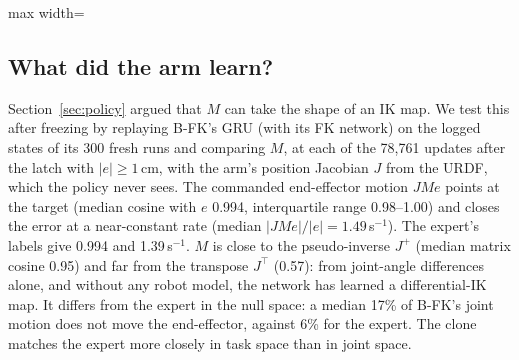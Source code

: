 \documentclass[conference]{IEEEtran}
\begin{document}
\begin{table}[t]
\centering\footnotesize
\caption{Ablations (validation set, 208 scenes, unless noted). Below the first two rows: URDF variant}
\label{tab:ablation}
\begin{adjustbox}{max width=\columnwidth}\end{adjustbox}
\end{table}

\subsection{What did the arm learn?}\label{sec:arm}
Section~\ref{sec:policy} argued that $M$ can take the shape of an IK map. We test this after freezing
by replaying B-FK's GRU (with its FK network) on the logged states of its 300 fresh runs and comparing
$M$, at each of the 78,761 updates after the latch with $|e|\ge1$\,cm, with the arm's position Jacobian
$J$ from the URDF, which the policy never sees. The commanded end-effector motion $JMe$ points at the
target (median cosine with $e$ 0.994, interquartile range 0.98--1.00) and closes the error at a
near-constant rate (median $|JMe|/|e|=1.49$\,s$^{-1}$). The expert's labels give 0.994 and 1.39\,s$^{-1}$. $M$ is close to the pseudo-inverse $J^{+}$
(median matrix cosine 0.95) and far from the transpose $J^\top$ (0.57): from joint-angle differences
alone, and without any robot model, the network has learned a differential-IK map. It differs from the
expert in the null space: a median 17\% of B-FK's joint motion does not move the end-effector, against
6\% for the expert. The clone matches the expert more closely in task space than in joint space.
\end{document}
